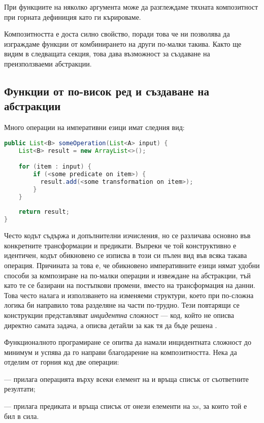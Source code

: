 При функциите на няколко аргумента може да разглеждаме тяхната композитност при горната дефиниция като ги кърироваме.

Композитността е доста силно свойство, поради това че ни позволява да изграждаме функции от комбинирането на други по-малки такива. Както ще видим в следващата секция, това дава възможност за създаване на преизползваеми абстракции.

\subsection{Функции от по-висок ред и създаване на абстракции}

Много операции на императивни езици имат следния вид:

\begin{lstlisting}[language=Java]
public List<B> someOperation(List<A> input) {
    List<B> result = new ArrayList<>();

    for (item : input) {
        if (<some predicate on item>) {
          result.add(<some transformation on item>);
        }
    }
    
    return result;
}
\end{lstlisting}

Често кодът съдържа и допълнителни изчисления, но се различава основно във конкретните трансформации и предикати. Въпреки че той конструктивно е идентичен, кодът обикновено се изписва в този си пълен вид във всяка такава операция. Причината за това е, че обикновено императивните езици нямат удобни способи за композиране на по-малки операции и извеждане на абстракции, тъй като те се базирани на постъпкови промени, вместо на трансформация на данни. Това често налага и използването на изменяеми структури, което при по-сложна логика би направило това разделяне на части по-трудно. Тези повтарящи се конструкции представляват \emph{инцидентна} сложност — код, който не описва директно самата задача, а описва детайли за как тя да бъде решена \cite{brroks1987NoSilverBullet}.

Функционалното програмиране се опитва да намали инцидентната сложност до минимум и успява да го направи благодарение на композитността. Нека да отделим от горния код две операции:

\begin{itemize*}
  \item {} — прилага операцията  върху всеки елемент на  и връща списък от съответните резултати;
  \item {} — прилага предиката  и връща списък от онези елементи на xs, за които той е бил в сила.
\end{itemize*}

